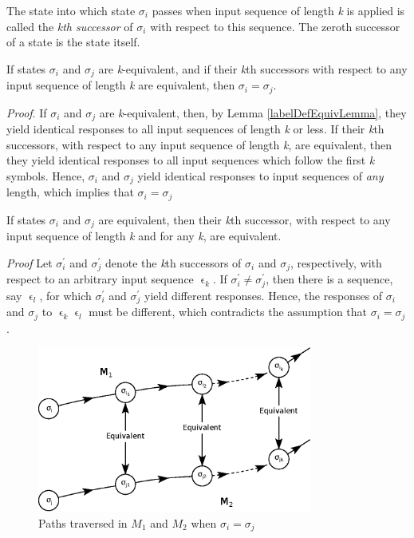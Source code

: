 \documentclass[a4paper]{report}
\begin{document}
    The state into which state $ \sigma_i $ passes when input sequence of length \emph{k} is applied is called the \emph{kth successor} of $ \sigma_i $ with respect to this sequence. The zeroth successor of a state is the state itself.

    \theorem If states $ \sigma_i $ and $ \sigma_j $ are \emph{k}-equivalent, and if their \emph{k}th successors with respect to any input sequence of length \emph{k} are equivalent, then $\sigma_i = \sigma_j$.

    \emph{Proof}. If $\sigma_i$ and $\sigma_j$ are \emph{k}-equivalent, then, by Lemma \ref{labelDefEquivLemma}, they yield identical responses to all input sequences of length \emph{k} or less. If their \emph{k}th successors, with respect to any input sequence of length \emph{k}, are equivalent, then they yield identical responses to all input sequences which follow the first \emph{k} symbols. Hence, $ \sigma_i $ and $ \sigma_j $ yield identical responses to input sequences of \emph{any} length, which implies that $\sigma_i = \sigma_j$

    \theorem \label{labelBelowKEquiv} If states $ \sigma_i $ and $ \sigma_j $ are equivalent, then their \emph{k}th successor, with respect to any input sequence of length \emph{k} and for any \emph{k}, are equivalent.

    \emph{Proof} Let $ \sigma^{'}_i$ and  $ \sigma^{'}_j$ denote the \emph{k}th successors of $\sigma_i$ and $\sigma_j$, respectively, with respect to an arbitrary input sequence $\upvarepsilon_k$. If $ \sigma^{'}_i \neq \sigma^{'}_j $, then there is a sequence, say $\upvarepsilon_l$, for which $ \sigma^{'}_i $ and $ \sigma^{'}_j $ yield different responses. Hence, the responses of $\sigma_i$ and $\sigma_j$ to $\upvarepsilon_k\upvarepsilon_l$ must be different, which contradicts the assumption that $ \sigma_i = \sigma_j $.

    \begin{figure}[!h]
        \centering
        \includegraphics[width=256pt,clip]{images/eps/pathsThroughM1AndM2}
        \caption{Paths traversed in $M_1$ and $M_2$ when $\sigma_i = \sigma_j$ }
        \label{fig:kEquivalenceTraversal}
    \end{figure}
\end{document}
